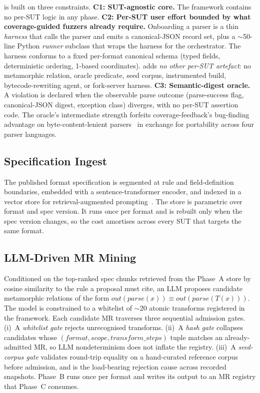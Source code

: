 \biotest{} is built on three constraints. \textbf{C1:
SUT-agnostic core.} The framework contains no per-SUT logic in
any phase. \textbf{C2: Per-SUT user effort bounded by what
coverage-guided fuzzers already require.} Onboarding a parser is
a thin \emph{harness} that calls the parser and emits a
canonical-JSON record set, plus a $\sim$50-line Python
\emph{runner} subclass that wraps the harness for the
orchestrator. The harness conforms to a fixed per-format
canonical schema (typed fields, deterministic ordering, 1-based
coordinates). \biotest{} adds \emph{no other per-SUT artefact}: no
metamorphic relation, oracle predicate, seed corpus, instrumented
build, bytecode-rewriting agent, or fork-server harness.
\textbf{C3: Semantic-digest oracle.} A violation is declared when
the observable parse outcome (parse-success flag, canonical-JSON
digest, exception class) diverges, with no per-SUT assertion
code. The oracle's intermediate strength forfeits
coverage-feedback's bug-finding advantage on byte-content-lenient
parsers~\citep{klees2018fuzz,boehme2020boosting} in exchange for
portability across four parser languages.

\subsection{Specification Ingest}
\label{sec:design-phase-a}

The published format specification is segmented at rule and
field-definition boundaries, embedded with a sentence-transformer
encoder, and indexed in a vector store for retrieval-augmented
prompting~\citep{lewis2020rag}. The store is parametric over
format and spec version. It runs once per format and is rebuilt
only when the spec version changes, so the cost amortises across
every SUT that targets the same format.

\subsection{LLM-Driven MR Mining}
\label{sec:design-phase-b}

Conditioned on the top-ranked spec chunks retrieved from the
Phase~A store by cosine similarity to the rule a proposal must
cite, an LLM proposes candidate metamorphic relations of the form
$\mathit{out}(\mathit{parse}(x)) \equiv
\mathit{out}(\mathit{parse}(T(x)))$. The model is constrained to
a whitelist of $\sim$20 atomic transforms registered in the
framework. Each candidate MR traverses three sequential admission
gates. (i)~A \emph{whitelist gate} rejects unrecognised
transforms. (ii)~A \emph{hash gate} collapses candidates whose
$(\mathit{format}, \mathit{scope}, \mathit{transform\_steps})$
tuple matches an already-admitted MR, so LLM nondeterminism does
not inflate the registry. (iii)~A \emph{seed-corpus gate}
validates round-trip equality on a hand-curated reference corpus
before admission, and is the load-bearing rejection cause across
recorded snapshots. Phase~B runs once per format and writes its
output to an MR registry that Phase~C consumes.

